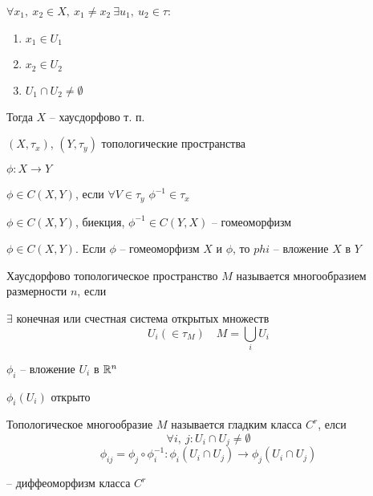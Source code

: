     \begin{definition}
        $\forall x_1, \ x_2 \in X, \ x_1 \not= x_2 \ \exists u_1, \ u_2 \in \tau$:
        \begin{enumerate}
            \item $x_1 \in U_1$
            \item $x_2 \in U_2$
            \item $U_1 \cap U_2 \not= \emptyset$
        \end{enumerate}
        \par Тогда $X$ -- хаусдорфово т. п.
    \end{definition}

    \begin{definition}
        $(X, \tau_x)$, $(Y, \tau_y)$ топологические пространства
        \par $\phi: X \rightarrow Y$
        \par $\phi \in C(X, Y)$, если $\forall V \in \tau_y$ $\phi^{-1} \in \tau_x$
    \end{definition}

    \begin{definition}
        $\phi \in C(X, Y)$, биекция, $\phi^{-1} \in C(Y, X)$ -- гомеоморфизм
    \end{definition}
    \begin{definition}
        $\phi \in C(X, Y)$. Если $\phi$ -- гомеоморфизм $X$ и $\phi$, то $phi$ -- вложение $X$ в $Y$
    \end{definition}


    \begin{definition}
        Хаусдорфово  топологическое пространство $M$ называется многообразием размерности $n$, если
        \par $\exists$ конечная или счестная система открытых множеств
        \[
            U_i(\in \tau_M) \quad M = \bigcup_i U_i    
        \]
        \par $\phi_i$ -- вложение $U_i$ в $\mathbb{R}^n$
        \par $\phi_i(U_i)$ открыто
    \end{definition}

    \begin{definition}
        Топологическое многообразие $M$ называется гладким класса $C^r$, елси
        \[
            \forall i, \ j : U_i \cap U_j \not= \emptyset    
        \]
        \[
            \phi_{ij} = \phi_j \circ \phi_i^{-1} : \phi_i (U_i \cap U_j) \rightarrow \phi_j(U_i \cap U_j)    
        \]
        \par -- диффеоморфизм класса $C^r$ 
    \end{definition}

